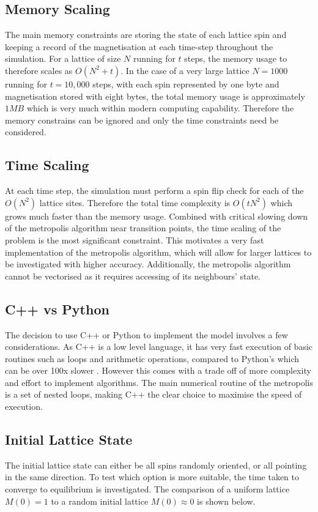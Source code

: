 \documentclass[a4paper, 12pt]{article}
\begin{document}
	\subsection{Memory Scaling}
	The main memory constraints are storing the state of each lattice spin and keeping a record of the magnetisation at each time-step throughout the simulation. For a lattice of size \(N\) running for \(t\) steps, the memory usage to therefore scales as \(O(N^2 + t)\). In the case of a very large lattice \(N=1000\) running for \(t=10,000\) steps, with each spin represented by one byte and magnetisation stored with eight bytes, the total memory usage is approximately \(1MB\) which is very much within modern computing capability. Therefore the memory constrains can be ignored and only the time constraints need be considered.

	\subsection{Time Scaling}
	At each time step, the simulation must perform a spin flip check for each of the \(O(N^2)\) lattice sites. Therefore the total time complexity is \(O(t N^2)\) which grows much faster than the memory usage. Combined with critical slowing down of the metropolis algorithm near transition points, the time scaling of the problem is the most significant constraint. This motivates a very fast implementation of the metropolis algorithm, which will allow for larger lattices to be investigated with higher accuracy. Additionally, the metropolis algorithm cannot be vectorised as it requires accessing of its neighbours' state. 

	\subsection{C++ vs Python}
	The decision to use C++ or Python to implement the model involves a few considerations. As C++ is a low level language, it has very fast execution of basic routines such as loops and arithmetic operations, compared to Python's which can be over 100x slower \cite{2}. However this comes with a trade off of more complexity and effort to implement algorithms. The main numerical routine of the metropolis is a set of nested loops, making C++ the clear choice to maximise the speed of execution. 

	\newpage
	\subsection{Initial Lattice State}
	The initial lattice state can either be all spins randomly oriented, or all pointing in the same direction. To test which option is more suitable, the time taken to converge to equilibrium is investigated. The comparison of a uniform lattice \(M(0)=1\) to a random initial lattice \(M(0) \approx 0 \) is shown below. 
\end{document}
